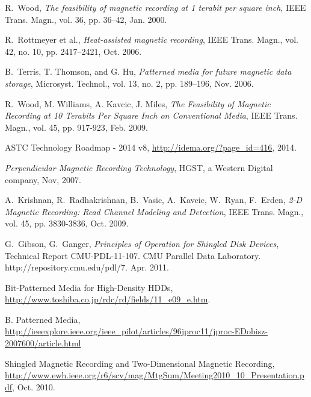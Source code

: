 \begin{thebibliography}{1}

R.~Wood, \emph{The feasibility of magnetic recording at 1 terabit per square
inch}, IEEE Trans. Magn., vol. 36, pp. 36–42, Jan. 2000.

R.~Rottmeyer et al., \emph{Heat-assisted magnetic recording}, IEEE Trans.
Magn., vol. 42, no. 10, pp. 2417–2421, Oct. 2006.

B.~Terris, T. Thomson, and G. Hu, \emph{Patterned media for future magnetic
data storage}, Microsyst. Technol., vol. 13, no. 2, pp. 189–196, Nov.
2006.

R.~Wood, M. Williams, A. Kavcic, J. Miles, \emph{The Feasibility of Magnetic Recording at 10 Terabits Per Square Inch on Conventional Media}, IEEE Trans. Magn., vol. 45, pp. 917-923, Feb. 2009.

ASTC Technology Roadmap - 2014 v8, \url{http://idema.org/?page_id=416}, 2014.

\emph{Perpendicular Magnetic Recording Technology}, HGST, a Western Digital company, Nov, 2007.

A.~Krishnan, R.~Radhakrishnan, B.~Vasic, A.~Kavcic, W.~Ryan, F.~Erden,
\emph{2-D Magnetic Recording: Read Channel Modeling and Detection}, IEEE Trans. Magn., vol. 45, pp. 3830-3836, Oct. 2009.


G.~Gibson, G.~Ganger, 
\emph{Principles of Operation for Shingled Disk Devices}, Technical Report
CMU-PDL-11-107. CMU Parallel Data Laboratory. http://repository.cmu.edu/pdl/7. Apr. 2011.

Bit-Patterned Media for High-Density HDDs, \url{http://www.toshiba.co.jp/rdc/rd/fields/11_e09_e.htm}.

B. Patterned Media, \url{http://ieeexplore.ieee.org/ieee_pilot/articles/96jproc11/jproc-EDobisz-2007600/article.html}

Shingled Magnetic Recording and Two-Dimensional Magnetic Recording, \url{http://www.ewh.ieee.org/r6/scv/mag/MtgSum/Meeting2010_10_Presentation.pdf}, Oct. 2010.


\end{thebibliography}
